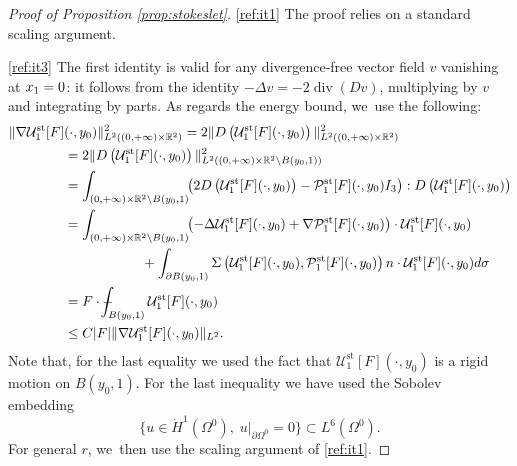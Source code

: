 \documentclass[10pt]{amsart}
\newcommand{\st}{\mathrm{st}}
\def\Xint#1{\mathchoice
{\XXint\displaystyle\textstyle{#1}}%
{\XXint\textstyle\scriptstyle{#1}}%
{\XXint\scriptstyle\scriptscriptstyle{#1}}%
{\XXint\scriptscriptstyle\scriptscriptstyle{#1}}%
\!\int}
\def\XXint#1#2#3{{\setbox0=\hbox{$#1{#2#3}{\int}$ }
\vcenter{\hbox{$#2#3$ }}\kern-.6\wd0}}
\def\dashint{\Xint-}
\renewcommand{\div}{\operatorname{div}}
\theoremstyle{plain}
\theoremstyle{definition}
\let\pa\partial
\newcommand{\R}{\mathbb{R}}
\begin{document}
\skpt
\begin{proof}[Proof of Proposition \ref{prop:stokeslet}]
\eqref{ref:it1} The proof relies on a standard scaling argument.

\eqref{ref:it3}
The first identity is valid for any divergence-free vector field $v$ vanishing at $x_1 =\nobreak 0$: it follows from the identity $-\Delta v = -2 \div(Dv)$, multiplying by $v$ and integrating by parts. As regards the energy bound, we~use the following:
\begin{align*}
\|\nabla \mathcal{U}^{\st}_1[F]&(\cdot,y_0)\|_{L^2((0,+\infty)\times \R^2)}^2=2\|D\left(\mathcal{U}^{\st}_1[F](\cdot,y_0)\right) \|_{L^2((0,+\infty)\times \R^2)}^2\\
&=2\|D \left(\mathcal{U}^{\st}_1[F](\cdot,y_0) \right) \|_{L^2((0,+\infty)\times \R^2 \setminus B(y_0,1))}^2\\
&= \int_{(0,+\infty)\times \R^2 \setminus B(y_0,1)}\!\! \left(2D\left(\mathcal{U}^{\st}_1[F](\cdot,y_0)\right)- \mathcal{P}^{\st}_1[F](\cdot,y_0) I_3\right) : D\left(\mathcal{U}^{\st}_1[F](\cdot,y_0)\right)\\
&= \int_{(0,+\infty)\times \R^2 \setminus B(y_0,1)}\!\! \left(- \Delta \mathcal{U}^{\st}_1[F](\cdot,y_0)+ \nabla \mathcal{P}^{\st}_1[F](\cdot,y_0)\right) \cdot \mathcal{U}^{\st}_1[F](\cdot,y_0)\\
&\hspace*{2cm}+
\int_{\partial B(y_0,1)} \Sigma\left (\mathcal{U}^{\st}_1[F](\cdot,y_0),\mathcal{P}^{\st}_1[F](\cdot,y_0)\right)n \cdot \mathcal{U}^{\st}_1[F](\cdot,y_0) d \sigma\\
&=F \cdot \dashint_{B(y_0,1)} \mathcal{U}^{\st}_1[F](\cdot,y_0) \\
&\leq C |F| \| \nabla \mathcal{U}^{\st}_1[F](\cdot,y_0) \|_{L^2}.
\end{align*}
Note that, for the last equality we used the fact that $\mathcal{U}^{\st}_1[F](\cdot,y_0)$ is a rigid motion on $B(y_0,1)$. For the last inequality we have used the Sobolev embedding
\[
\{ u \in \dot{H}^1(\Omega^0), \; u\vert_{\pa \Omega^0}= 0 \} \subset L^6(\Omega^0).
\]
For general $r$, we~then use the scaling argument of \eqref{ref:it1}.


\end{proof}
\end{document}
